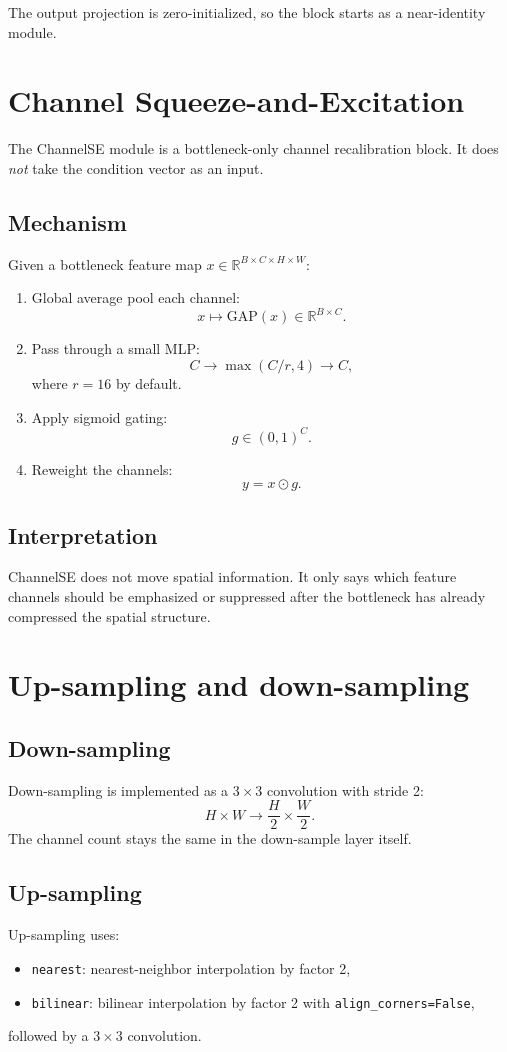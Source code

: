 \documentclass[11pt]{article}
\begin{document}
The output projection is zero-initialized, so the block starts as a near-identity module.

\section{Channel Squeeze-and-Excitation}
The ChannelSE module is a bottleneck-only channel recalibration block. It does \emph{not} take the condition vector as an input.

\subsection{Mechanism}
Given a bottleneck feature map $x \in \mathbb{R}^{B \times C \times H \times W}$:
\begin{enumerate}
  \item Global average pool each channel:
  \[
  x \mapsto \mathrm{GAP}(x) \in \mathbb{R}^{B \times C}.
  \]
  \item Pass through a small MLP:
  \[
  C \to \max(C/r, 4) \to C,
  \]
  where $r=16$ by default.
  \item Apply sigmoid gating:
  \[
  g \in (0,1)^C.
  \]
  \item Reweight the channels:
  \[
  y = x \odot g.
  \]
\end{enumerate}

\subsection{Interpretation}
ChannelSE does not move spatial information. It only says which feature channels should be emphasized or suppressed after the bottleneck has already compressed the spatial structure.

\section{Up-sampling and down-sampling}
\subsection{Down-sampling}
Down-sampling is implemented as a $3 \times 3$ convolution with stride 2:
\[
H \times W \to \frac{H}{2} \times \frac{W}{2}.
\]
The channel count stays the same in the down-sample layer itself.

\subsection{Up-sampling}
Up-sampling uses:
\begin{itemize}
  \item \texttt{nearest}: nearest-neighbor interpolation by factor 2,
  \item \texttt{bilinear}: bilinear interpolation by factor 2 with \texttt{align\_corners=False},
\end{itemize}
followed by a $3 \times 3$ convolution.
\end{document}
